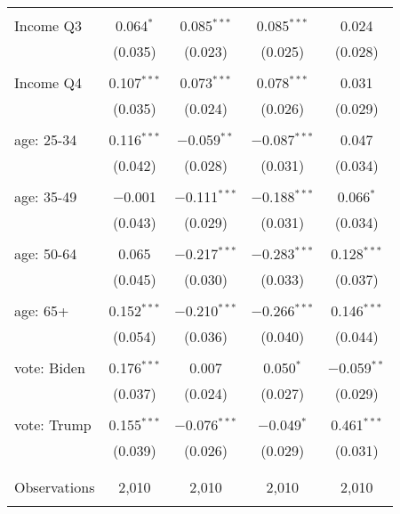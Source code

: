 \begin{tabular}{@{\extracolsep{5pt}}lcccc}
  & & & & \\ 
 Income Q3 & 0.064$^{*}$ & 0.085$^{***}$ & 0.085$^{***}$ & 0.024 \\ 
  & (0.035) & (0.023) & (0.025) & (0.028) \\ 
  & & & & \\ 
 Income Q4 & 0.107$^{***}$ & 0.073$^{***}$ & 0.078$^{***}$ & 0.031 \\ 
  & (0.035) & (0.024) & (0.026) & (0.029) \\ 
  & & & & \\ 
 age: 25-34 & 0.116$^{***}$ & $-$0.059$^{**}$ & $-$0.087$^{***}$ & 0.047 \\ 
  & (0.042) & (0.028) & (0.031) & (0.034) \\ 
  & & & & \\ 
 age: 35-49 & $-$0.001 & $-$0.111$^{***}$ & $-$0.188$^{***}$ & 0.066$^{*}$ \\ 
  & (0.043) & (0.029) & (0.031) & (0.034) \\ 
  & & & & \\ 
 age: 50-64 & 0.065 & $-$0.217$^{***}$ & $-$0.283$^{***}$ & 0.128$^{***}$ \\ 
  & (0.045) & (0.030) & (0.033) & (0.037) \\ 
  & & & & \\ 
 age: 65+ & 0.152$^{***}$ & $-$0.210$^{***}$ & $-$0.266$^{***}$ & 0.146$^{***}$ \\ 
  & (0.054) & (0.036) & (0.040) & (0.044) \\ 
  & & & & \\ 
 vote: Biden & 0.176$^{***}$ & 0.007 & 0.050$^{*}$ & $-$0.059$^{**}$ \\ 
  & (0.037) & (0.024) & (0.027) & (0.029) \\ 
  & & & & \\ 
 vote: Trump & 0.155$^{***}$ & $-$0.076$^{***}$ & $-$0.049$^{*}$ & 0.461$^{***}$ \\ 
  & (0.039) & (0.026) & (0.029) & (0.031) \\ 
  & & & & \\ 
\hline \\[-1.8ex] 

Observations & 2,010 & 2,010 & 2,010 & 2,010 \\ 
\hline 
\hline \\[-1.8ex] 
\end{tabular} 